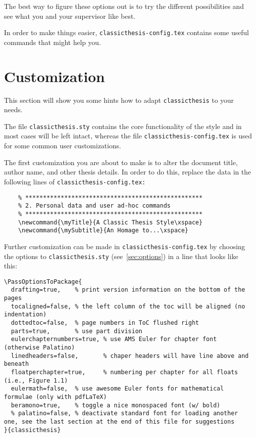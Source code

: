 The best way to figure these options out is to try the different
possibilities and see what you and your supervisor like best.

In order to make things easier, \texttt{classicthesis-config.tex}
contains some useful commands that might help you.


\section{Customization}\label{sec:custom}
This section will show you some hints how to adapt
\texttt{classicthesis} to your needs.

The file \texttt{classicthesis.sty}
contains the core functionality of the style and in most cases will
be left intact, whereas the file \texttt{classic\-thesis-config.tex}
is used for some common user customizations.

The first customization you are about to make is to alter the document
title, author name, and other thesis details. In order to do this, replace
the data in the following lines of \texttt{classicthesis-config.tex:}%

\begin{lstlisting}
    % **************************************************
    % 2. Personal data and user ad-hoc commands
    % **************************************************
    \newcommand{\myTitle}{A Classic Thesis Style\xspace}
    \newcommand{\mySubtitle}{An Homage to...\xspace}
\end{lstlisting}

Further customization can be made in \texttt{classicthesis-config.tex}
by choosing the options to \texttt{classicthesis.sty}
(see~\autoref{sec:options}) in a line that looks like this:

\begin{lstlisting}
\PassOptionsToPackage{
  drafting=true,    % print version information on the bottom of the pages
  tocaligned=false, % the left column of the toc will be aligned (no indentation)
  dottedtoc=false,  % page numbers in ToC flushed right
  parts=true,       % use part division
  eulerchapternumbers=true, % use AMS Euler for chapter font (otherwise Palatino)
  linedheaders=false,       % chaper headers will have line above and beneath
  floatperchapter=true,     % numbering per chapter for all floats (i.e., Figure 1.1)
  eulermath=false,  % use awesome Euler fonts for mathematical formulae (only with pdfLaTeX)
  beramono=true,    % toggle a nice monospaced font (w/ bold)
  % palatino=false, % deactivate standard font for loading another one, see the last section at the end of this file for suggestions
}{classicthesis}
\end{lstlisting}
